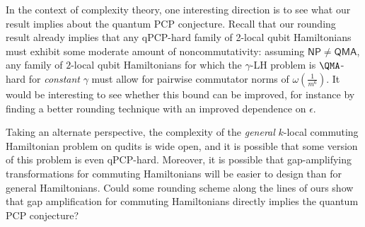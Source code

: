 \documentclass[11pt]{article}
\theoremstyle{plain}
\begin{document}
In the context of complexity theory, one interesting direction is to see what our result implies about the quantum PCP conjecture. Recall that our rounding result already implies that any qPCP-hard family of 2-local qubit Hamiltonians must exhibit some moderate amount of noncommutativity: assuming $\mathsf{NP} \neq \mathsf{QMA}$, any
family of $2$-local qubit Hamiltonians for which the $\gamma$-LH problem is $\QMA$-hard for \emph{constant} $\gamma$ must allow for pairwise commutator norms of $\omega(\frac{1}{m^6})$. It would be interesting to see whether this bound can be improved, for instance by finding a better rounding technique with an improved dependence on $\epsilon$.

Taking an alternate perspective, the complexity of the \emph{general} $k$-local commuting Hamiltonian problem on qudits is wide open, and it is possible that some version of this problem is even qPCP-hard. Moreover, it is possible that gap-amplifying transformations for commuting Hamiltonians will be easier to design than for general Hamiltonians. Could some rounding scheme along the lines of ours show that gap amplification for commuting Hamiltonians directly implies the quantum PCP conjecture?



\end{document}
